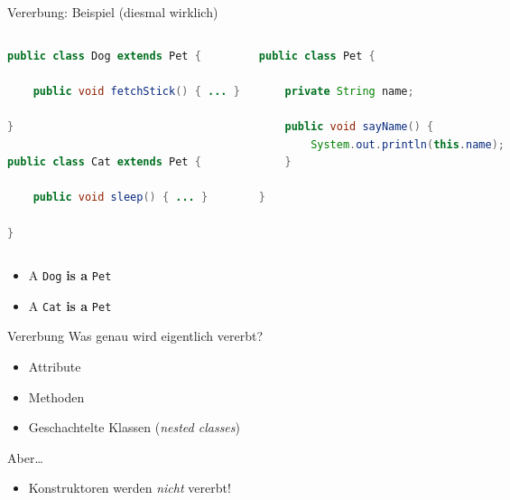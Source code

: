 \documentclass[18pt]{beamer}
\begin{document}
\begin{frame}[fragile]{Vererbung: Beispiel (diesmal wirklich)}
    \begin{columns}[c]
            \begin{exampleblock}{}
                \begin{lstlisting}[language=Java,basicstyle=\scriptsize]
public class Dog extends Pet {

    public void fetchStick() { ... }

}

public class Cat extends Pet {

    public void sleep() { ... }

}
                \end{lstlisting}
            \end{exampleblock}
            \begin{exampleblock}{}
                \begin{lstlisting}[language=Java,basicstyle=\scriptsize]
public class Pet {

    private String name;

    public void sayName() {
        System.out.println(this.name);
    }

}
                \end{lstlisting}
            \end{exampleblock}
    \end{columns}

    \begin{itemize}
        \item A \texttt{Dog} \textbf{is a} \texttt{Pet}
        \item A \texttt{Cat} \textbf{is a} \texttt{Pet}
    \end{itemize}
\end{frame}

\begin{frame}{Vererbung}
    Was genau wird eigentlich vererbt?
    \vspace{.2in}
    \begin{itemize}
        \item Attribute
        \item Methoden
        \item Geschachtelte Klassen (\textit{nested classes})
    \end{itemize}
    \vspace{.2in}
    Aber\dots
    \begin{itemize}
        \item \alert{Konstruktoren werden \textit{nicht} vererbt!}
    \end{itemize}
\end{frame}
\end{document}
